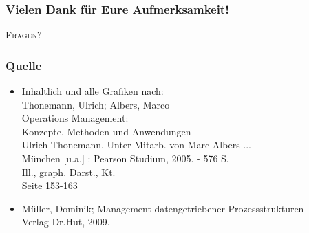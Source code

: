 \documentclass{beamer}
\begin{document}
  
   \begin{frame}
  \frametitle{Vielen Dank für Eure Aufmerksamkeit!}
\begin{center}
  \begin{Huge}
\textsc{Fragen?}
\end{Huge}
  
\end{center}
  \end{frame}
    

 \begin{frame}
  \frametitle{Quelle}
   \begin{itemize}
    \item Inhaltlich und alle Grafiken nach:\\
      Thonemann, Ulrich; Albers, Marco\\
      Operations Management:\\
      Konzepte, Methoden und Anwendungen\\
      Ulrich Thonemann. Unter Mitarb. von Marc Albers ... \\
      München [u.a.] : Pearson Studium, 2005. - 576 S.\\
      Ill., graph. Darst., Kt.\\
      Seite 153-163
     \item Müller, Dominik; Management datengetriebener Prozessstrukturen\\
      Verlag Dr.Hut, 2009.
   \end{itemize}
 \end{frame}
\end{document}
